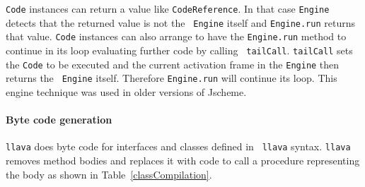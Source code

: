 \documentclass{acm-final/sig-alternate-modified}
\begin{document}
{\tt Code} instances can return a value like {\tt CodeReference}.  In
that case {\tt Engine} detects that the returned value is not the {\tt
Engine} itself and {\tt Engine.run} returns that value.  {\tt Code}
instances can also arrange to have the {\tt Engine.run} method to
continue in its loop evaluating further code by calling {\tt
tailCall}.  {\tt tailCall} sets the {\tt Code} to be executed and the
current activation frame in the {\tt Engine} then returns the {\tt
Engine} itself.  Therefore {\tt Engine.run} will continue its loop.
This engine technique was used in older versions of Jscheme.

\paragraph{Byte code generation}

{\tt llava} does byte code for interfaces and classes defined in {\tt
llava} syntax.  {\tt llava} removes method bodies and replaces it with
code to call a procedure representing the body as shown in
Table~\ref{classCompilation}.
\end{document}
